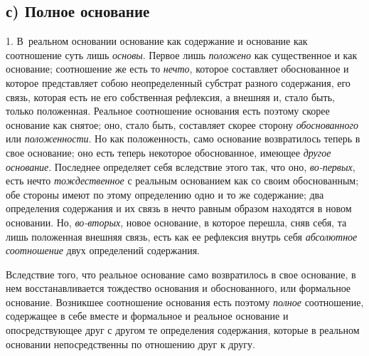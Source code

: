 \subsection[с) Полное основание]{с) Полное основание}
1. В~реальном основании основание как содержание
и основание как соотношение суть лишь {\em основы}.
Первое лишь {\em положено} как существенное и как
основание; соотношение же есть то {\em нечто}, которое
составляет обоснованное и которое представляет собою неопределенный
субстрат разного содержания, его связь, которая есть не его собственная
рефлексия, а внешняя и, стало быть, только положенная. Реальное соотношение
основания есть поэтому скорее основание как снятое; оно, стало быть,
составляет скорее сторону {\em обоснованного} или
{\em положенности}. Но как положенность, само основание
возвратилось теперь в свое основание; оно есть теперь некоторое
обоснованное, имеющее {\em другое основание}. Последнее
определяет себя вследствие этого так, что оно,
{\em во-первых}, есть нечто
{\em тождественное} с реальным основанием как со своим
обоснованным; обе стороны имеют по этому определению одно и то же
содержание; два определения содержания и их связь в нечто равным образом
находятся в новом основании. Но, {\em во-вторых}, новое
основание, в которое перешла, сняв себя, та лишь положенная внешняя связь,
есть как ее рефлексия внутрь себя {\em абсолютное
соотношение} двух определений содержания.

Вследствие того, что реальное основание само возвратилось в свое основание,
в нем восстанавливается тождество основания и обоснованного, или формальное
основание. Возникшее соотношение основания есть поэтому
{\em полное} соотношение, содержащее в себе вместе и
формальное и реальное основание и опосредствующее друг с другом те
определения содержания, которые в реальном основании непосредственны по
отношению друг к другу.

